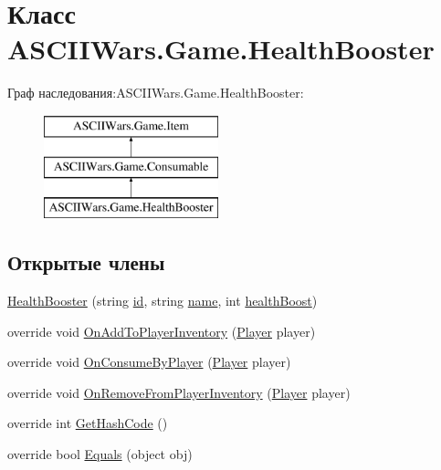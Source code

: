 \hypertarget{class_a_s_c_i_i_wars_1_1_game_1_1_health_booster}{}\section{Класс A\+S\+C\+I\+I\+Wars.\+Game.\+Health\+Booster}
\label{class_a_s_c_i_i_wars_1_1_game_1_1_health_booster}
Граф наследования\+:A\+S\+C\+I\+I\+Wars.\+Game.\+Health\+Booster\+:\begin{figure}[H]
\begin{center}
\leavevmode
\includegraphics[height=3.000000cm]{class_a_s_c_i_i_wars_1_1_game_1_1_health_booster}
\end{center}
\end{figure}
\subsection*{Открытые члены}
\begin{DoxyCompactItemize}
\item 
\hyperlink{class_a_s_c_i_i_wars_1_1_game_1_1_health_booster_ac7796979395fc12db8b4a8d9a9ba7d7e}{Health\+Booster} (string \hyperlink{class_a_s_c_i_i_wars_1_1_game_1_1_item_a744d51f7684a4e46a1f834f8666db58e}{id}, string \hyperlink{class_a_s_c_i_i_wars_1_1_game_1_1_item_a994b9ec5f10c123e4345da159c090091}{name}, int \hyperlink{class_a_s_c_i_i_wars_1_1_game_1_1_health_booster_abd6f83cc8e561198c5939ba4a20fd826}{health\+Boost})
\item 
override void \hyperlink{class_a_s_c_i_i_wars_1_1_game_1_1_health_booster_a99740fd21f80211f6a2058737b159425}{On\+Add\+To\+Player\+Inventory} (\hyperlink{class_a_s_c_i_i_wars_1_1_game_1_1_player}{Player} player)
\item 
override void \hyperlink{class_a_s_c_i_i_wars_1_1_game_1_1_health_booster_a0dd6134e102b2b4ea9d143b7cea15568}{On\+Consume\+By\+Player} (\hyperlink{class_a_s_c_i_i_wars_1_1_game_1_1_player}{Player} player)
\item 
override void \hyperlink{class_a_s_c_i_i_wars_1_1_game_1_1_health_booster_ae06407b04a0e81da31c14c546d6aaaaf}{On\+Remove\+From\+Player\+Inventory} (\hyperlink{class_a_s_c_i_i_wars_1_1_game_1_1_player}{Player} player)
\item 
override int \hyperlink{class_a_s_c_i_i_wars_1_1_game_1_1_health_booster_a79fdb10389338ad400f723a76ce30d7d}{Get\+Hash\+Code} ()
\item 
override bool \hyperlink{class_a_s_c_i_i_wars_1_1_game_1_1_health_booster_a5396e7ebb46c32e36fefeb86ab4727d3}{Equals} (object obj)
\end{DoxyCompactItemize}

